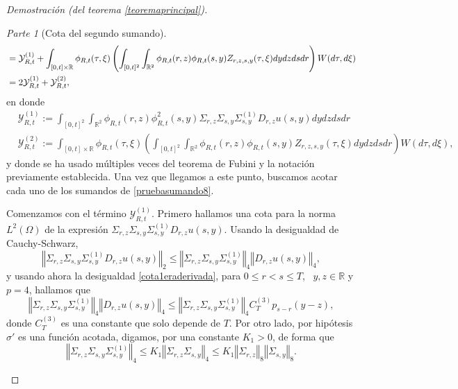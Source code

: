 \documentclass[letterpaper,twoside,12pt]{book}
\newcommand{\R}{\mathbb{R}}
\newcommand{\1}{\mathds{1}}
\newcommand{\norm}[1]{\left\Vert #1 \right\Vert}
\theoremstyle{definition}
\theoremstyle{definition}
\theoremstyle{remark}
\newtheorem{proofpart}{Parte}
\theoremstyle{definition}
\theoremstyle{definition}
\theoremstyle{definition}
\theoremstyle{definition}
\theoremstyle{definition}
\begin{document}
\begin{proof}[Demostración (del teorema \ref{teoremaprincipal})]
\begin{proofpart}[Cota del segundo sumando]
\begin{align}
   &=\mathcal{Y}_{R,t}^{(1)}+\int_{[0,t]\times\R}\phi_{R,t}(\tau,\xi)\left(\int_{[0,t]^2}\int_{\R^2}\phi_{R,t}(r,z)\phi_{R,t}(s,y)Z_{r,z,s,y}(\tau,\xi)dy dz ds dr\right)W(d\tau,d\xi)\notag\\
   &=2\mathcal{Y}_{R,t}^{(1)}+\mathcal{Y}_{R,t}^{(2)},\label{pruebasumando8}
\end{align}
en donde 
\begin{align*}
   &\mathcal{Y}_{R,t}^{(1)}:=\int_{[0,t]^2}\int_{\R^2}\phi_{R,t}(r,z)\phi_{R,t}^2(s,y)\Sigma_{r,z}\Sigma_{s,y}\Sigma^{(1)}_{s,y}D_{r,z}u(s,y)dy dz ds dr\\
   &\mathcal{Y}_{R,t}^{(2)}:=\int_{[0,t]\times\R}\phi_{R,t}(\tau,\xi)\left(\int_{[0,t]^2}\int_{\R^2}\phi_{R,t}(r,z)\phi_{R,t}(s,y)Z_{r,z,s,y}(\tau,\xi)dy dz ds dr\right)W(d\tau,d\xi),
\end{align*}
y donde se ha usado múltiples veces del teorema de Fubini y la notación previamente establecida. Una vez que llegamos a este punto, buscamos acotar cada uno de los sumandos de \eqref{pruebasumando8}. 

Comenzamos con el término $\mathcal{Y}_{R,t}^{(1)}$. Primero hallamos una cota para la norma $L^2(\Omega)$ de la expresión $\Sigma_{r,z}\Sigma_{s,y}\Sigma_{s,y}^{(1)}D_{r,z}u(s,y)$. Usando la desigualdad de Cauchy-Schwarz, 
\[
   \norm{\Sigma_{r,z}\Sigma_{s,y}\Sigma_{s,y}^{(1)}D_{r,z}u(s,y)}_2\leq \norm{\Sigma_{r,z}\Sigma_{s,y}\Sigma_{s,y}^{(1)}}_4\norm{D_{r,z}u(s,y)}_4, 
\]
y usando ahora la desigualdad \eqref{cota1eraderivada}, para $0\leq r<s\leq T$, \ $y,z\in \R$ y $p=4$, hallamos que 
\begin{equation}\label{pruebacotasigma1}
      \norm{\Sigma_{r,z}\Sigma_{s,y}\Sigma_{s,y}^{(1)}}_4\norm{D_{r,z}u(s,y)}_4\leq \norm{\Sigma_{r,z}\Sigma_{s,y}\Sigma_{s,y}^{(1)}}_4C_{T}^{(3)}p_{s-r}(y-z),   
\end{equation}
donde $C_{T}^{(3)}$ es una constante que solo depende de $T$. Por otro lado, por hipótesis $\sigma'$ es una función acotada, digamos, por una constante $K_1>0$, de forma que 
\begin{equation}\label{pruebacotasigma2}
   \norm{\Sigma_{r,z}\Sigma_{s,y}\Sigma_{s,y}^{(1)}}_4\leq K_1\norm{\Sigma_{r,z}\Sigma_{s,y}}_4\leq K_1\norm{\Sigma_{r,z}}_8\norm{\Sigma_{s,y}}_{8}.
\end{equation}
   

\end{proofpart}
\end{proof}
\end{document}
